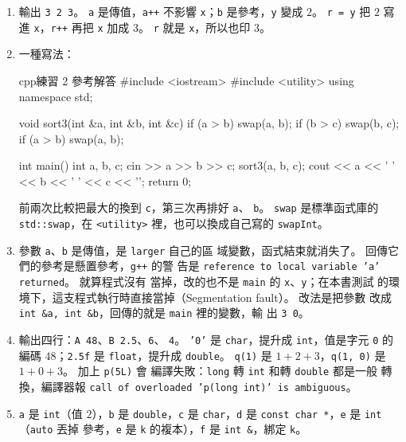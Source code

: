 \begin{enumerate}
\item 輸出 \texttt{3 2 3}。 \texttt{a} 是傳值，\texttt{a++} 不影響
\texttt{x}；\texttt{b} 是參考，\texttt{y} 變成 $2$。 \texttt{r = y}
把 $2$ 寫進 \texttt{x}，\texttt{r++} 再把 \texttt{x} 加成 $3$。
\texttt{r} 就是 \texttt{x}，所以也印 $3$。
\item 一種寫法：
\begin{code}{cpp}{練習 2 參考解答}
#include <iostream>
#include <utility>
using namespace std;

void sort3(int &a, int &b, int &c) {
    if (a > b) swap(a, b);
    if (b > c) swap(b, c);
    if (a > b) swap(a, b);
}

int main() {
    int a, b, c;
    cin >> a >> b >> c;
    sort3(a, b, c);
    cout << a << ' ' << b << ' ' << c << '\n';
    return 0;
}
\end{code}
前兩次比較把最大的換到 \texttt{c}，第三次再排好 \texttt{a}、
\texttt{b}。 \texttt{swap} 是標準函式庫的 \texttt{std::swap}，在
\texttt{<utility>} 裡，也可以換成自己寫的 \texttt{swapInt}。
\item 參數 \texttt{a}、\texttt{b} 是傳值，是 \texttt{larger} 自己的區
域變數，函式結束就消失了。 回傳它們的參考是懸置參考，\texttt{g++} 的警
告是 \texttt{reference to local variable 'a' returned}。 就算程式沒有
當掉，改的也不是 \texttt{main} 的 \texttt{x}、\texttt{y}；在本書測試
的環境下，這支程式執行時直接當掉（Segmentation fault）。 改法是把參數
改成 \texttt{int \&a, int \&b}，回傳的就是 \texttt{main} 裡的變數，輸
出 \texttt{3 0}。
\item 輸出四行：\texttt{A 48}、\texttt{B 2.5}、\texttt{6}、
\texttt{4}。 \texttt{'0'} 是 \texttt{char}，提升成
\texttt{int}，值是字元 \texttt{0} 的編碼 $48$；\texttt{2.5f} 是
\texttt{float}，提升成 \texttt{double}。 \texttt{q(1)} 是
$1 + 2 + 3$，\texttt{q(1, 0)} 是 $1 + 0 + 3$。 加上 \texttt{p(5L)} 會
編譯失敗：\texttt{long} 轉 \texttt{int} 和轉 \texttt{double} 都是一般
轉換，編譯器報 \texttt{call of overloaded 'p(long int)' is
ambiguous}。
\item \texttt{a} 是 \texttt{int}（值 $2$），\texttt{b} 是
\texttt{double}，\texttt{c} 是 \texttt{char}，\texttt{d} 是
\texttt{const char *}，\texttt{e} 是 \texttt{int}（\texttt{auto} 丟掉
參考，\texttt{e} 是 \texttt{k} 的複本），\texttt{f} 是
\texttt{int \&}，綁定 \texttt{k}。
\end{enumerate}
